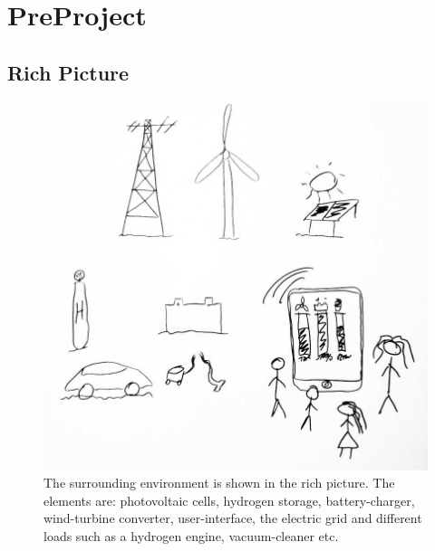 \chapter{PreProject}
\section{Rich Picture}

\begin{figure}[h!]		%
 \begin{centering}
  \includegraphics[width=1\textwidth]{images/rich_picture1.png}
   \caption{The surrounding environment is shown in the rich picture. The
 			 elements are: photovoltaic cells, hydrogen storage, battery-charger, wind-turbine
 			 converter, user-interface, the electric grid and different loads such as a
 			 hydrogen engine, vacuum-cleaner etc. }
 \end{centering}
\end{figure}

